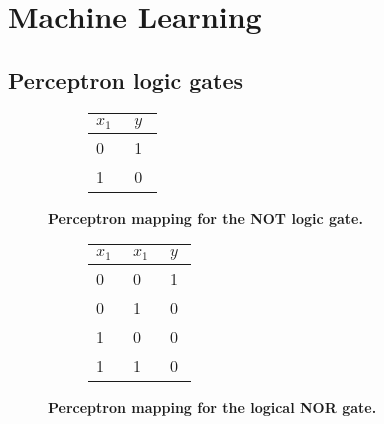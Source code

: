\newpage\section{Machine Learning}

\subsection{Perceptron logic gates}


\begin{figure}[!htp]
    \centering
    \begin{subfigure}[b]{0.70\textwidth}
        \centering
        
        \captionsetup{format=hang} %
        \label{fig:perceptron:not:mapping}
    \end{subfigure}\hfil
    \begin{subfigure}[b]{0.29\textwidth}
        \centering
        \renewcommand{\arraystretch}{1.5}
        \begin{tabular}{C{0.1\linewidth}|C{0.1\linewidth}}
            \hline
            $x_1$ & $y$ \\      & 1   \\
            1     & 0
        \end{tabular}
        \vspace{0.5cm}
        \label{fig:perceptron:not:truth}
    \end{subfigure}\hfil
    \captionsetup{format=hang} %
    \caption{
            \textbf{Perceptron mapping for the NOT logic gate.}
    }
    \label{fig:perceptron:not}
\end{figure}

\begin{figure}[!htp]
    \centering
    \begin{subfigure}[b]{0.70\textwidth}
        \centering
        
        \captionsetup{format=hang} %
        \label{fig:perceptron:nor:mapping}
    \end{subfigure}\hfil
    \begin{subfigure}[b]{0.29\textwidth}
        \centering
        \renewcommand{\arraystretch}{1.5}
        \begin{tabular}{C{0.1\linewidth}C{0.1\linewidth}|C{0.1\linewidth}}
            \hline
            $x_1$ & $x_1$ & $y$ \\      & 0     & 1   \\
            0     & 1     & 0   \\
            1     & 0     & 0   \\
            1     & 1     & 0
        \end{tabular}
        \vspace{0.5cm}
        \label{fig:perceptron:nor:truth}
    \end{subfigure}\hfil
    \captionsetup{format=hang} %
    \caption{
        \textbf{Perceptron mapping for the logical NOR gate.}
    }
    \label{fig:perceptron:nor}
\end{figure}

